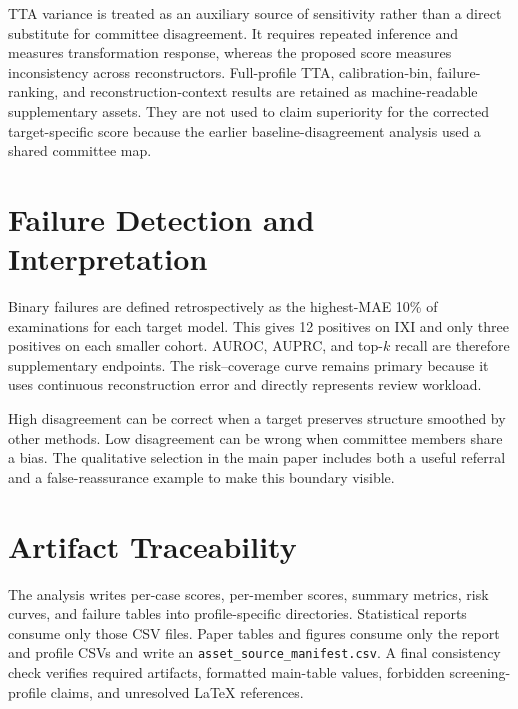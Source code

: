 \documentclass[twocolumn]{article}
\begin{document}
TTA variance is treated as an auxiliary source of sensitivity rather than a direct substitute for committee disagreement. It requires repeated inference and measures transformation response, whereas the proposed score measures inconsistency across reconstructors. Full-profile TTA, calibration-bin, failure-ranking, and reconstruction-context results are retained as machine-readable supplementary assets. They are not used to claim superiority for the corrected target-specific score because the earlier baseline-disagreement analysis used a shared committee map.

\section{Failure Detection and Interpretation}

Binary failures are defined retrospectively as the highest-MAE 10\% of examinations for each target model. This gives 12 positives on IXI and only three positives on each smaller cohort. AUROC, AUPRC, and top-$k$ recall are therefore supplementary endpoints. The risk--coverage curve remains primary because it uses continuous reconstruction error and directly represents review workload.

High disagreement can be correct when a target preserves structure smoothed by other methods. Low disagreement can be wrong when committee members share a bias. The qualitative selection in the main paper includes both a useful referral and a false-reassurance example to make this boundary visible.

\section{Artifact Traceability}

The analysis writes per-case scores, per-member scores, summary metrics, risk curves, and failure tables into profile-specific directories. Statistical reports consume only those CSV files. Paper tables and figures consume only the report and profile CSVs and write an \texttt{asset\_source\_manifest.csv}. A final consistency check verifies required artifacts, formatted main-table values, forbidden screening-profile claims, and unresolved LaTeX references.
\end{document}
